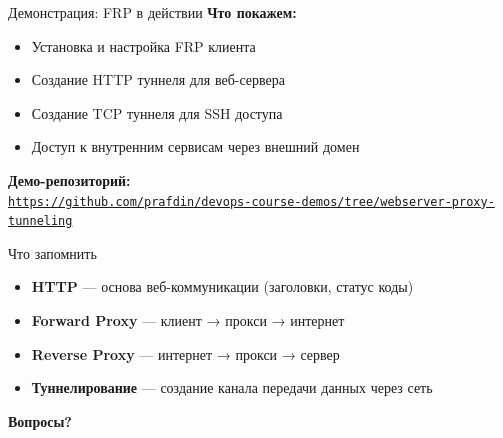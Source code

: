 \documentclass[aspectratio=169]{beamer}
\begin{document}
    \begin{frame}{Демонстрация: FRP в действии}
        \textbf{Что покажем:}
        \begin{itemize}
            \item Установка и настройка FRP клиента
            \item Создание HTTP туннеля для веб-сервера
            \item Создание TCP туннеля для SSH доступа
            \item Доступ к внутренним сервисам через внешний домен
        \end{itemize}

        \vspace{0.2cm}
        \textbf{Демо-репозиторий:} \\
        \href{https://github.com/prafdin/devops-course-demos/tree/webserver-proxy-tunneling}{\texttt{https://github.com/prafdin/devops-course-demos/tree/webserver-proxy-tunneling}}

    \end{frame}

    \begin{frame}{Что запомнить}
        \begin{itemize}
            \item \textbf{HTTP} — основа веб-коммуникации (заголовки, статус коды)
            \item \textbf{Forward Proxy} — клиент → прокси → интернет
            \item \textbf{Reverse Proxy} — интернет → прокси → сервер
            \item \textbf{Туннелирование} — создание канала передачи данных через сеть
        \end{itemize}

        \vspace{1cm}

        \begin{center}
            \textbf{Вопросы?}
        \end{center}
    \end{frame}
\end{document}
